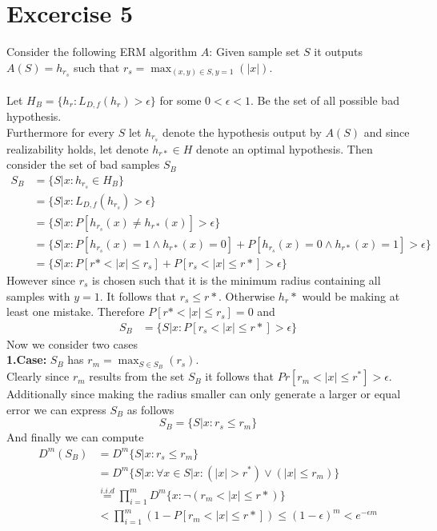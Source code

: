 \documentclass[12pt]{article}
\begin{document}
\section*{Excercise 5}
Consider the following ERM algorithm $A$: Given sample set $S$ it outputs $A(S)=h_{r_s}$ such that $r_s = \max_{(x,y) \in S, y=1}(|x|)$. \\\\
Let $H_B=\{h_r: L_{D,f}(h_r) > \epsilon\}$ for some $0 < \epsilon < 1$. Be the set of all possible bad hypothesis. \\
Furthermore for every $S$ let $h_{r_s}$ denote the hypothesis output by $A(S)$ and since realizability holds, let denote $h_{r*} \in H$ denote an optimal hypothesis. Then consider the set of bad samples $S_B$
\begin{align*}
	S_B &= \{S|x : h_{r_s} \in H_B\} \\
	&= \{S|x: L_{D,f}(h_{r_s}) > \epsilon\} \\
	&= \{S|x: P[h_{r_s}(x) \neq h_{r*}(x)] > \epsilon\} \\
	&= \{S|x: P[h_{r_s}(x) = 1 \land h_{r*}(x) = 0] +  P[h_{r_s}(x) = 0 \land h_{r*}(x) = 1] > \epsilon \}\\
	&= \{S|x: P[r* < |x| \leq r_s] + P[r_s < |x| \leq r*] > \epsilon \}
\end{align*}
However since $r_s$ is chosen such that it is the minimum radius containing all samples with $y=1$. It follows that $r_s \leq r*$. Otherwise $h_r*$ would be making at least one mistake. Therefore $P[r* < |x| \leq r_s] = 0$ and
\begin{align*}
	S_B &= \{S|x:  P[r_s < |x| \leq r*] > \epsilon \}
\end{align*}
Now we consider two cases\\
\textbf{1.Case: }$S_B$ has $r_m = \max_{S \in S_B} (r_s)$.\\
Clearly since $r_m$ results from the set $S_B$ it follows that $Pr[r_m < |x| \leq r^*] > \epsilon$. Additionally since making the radius smaller can only generate a larger or equal error we can express $S_B$ as follows
\begin{equation*}
	S_B = \{S|x: r_s \leq r_m\}
\end{equation*}
And finally we can compute
\begin{align*}
	D^m(S_B) &= D^m \{S|x : r_s \leq r_m\}\\
	&= D^m \{S|x : \forall x \in S|x: (|x| > r^*) \lor (|x| \leq r_m)\} \\
	&\overset{i.i.d}{=} \prod_{i=1}^{m} D^m\{x: \neg (r_m < |x|\leq r*)\} \\
	&< \prod_{i=1}^{m} (1- P[r_m < |x| \leq r*]) \leq (1- \epsilon)^m < e^{-\epsilon m}
\end{align*}
\end{document}
